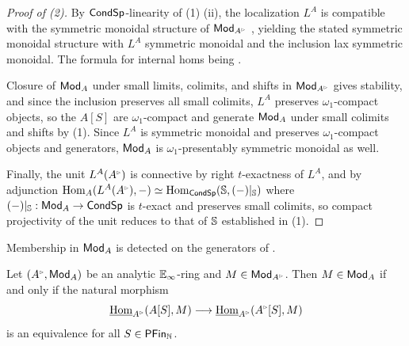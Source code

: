 \begin{proof}[Proof of (2)]
    By $\mathsf{Cond}\mathsf{Sp}$-linearity of  (1) (ii), the localization $L^{A}$ is compatible with the symmetric monoidal structure of $\Mod_{A^{\tri}}$ \cite[Lem. 7.4 \& 7.5]{RagimovReflection}, yielding the stated symmetric monoidal structure with $L^{A}$ symmetric monoidal and the inclusion lax symmetric monoidal. The formula for internal homs being \cite[Cor. 7.6]{RagimovReflection}. 
    
    Closure of $\mathsf{Mod}_{A}$ under small limits, colimits, and shifts in $\Mod_{A^{\tri}}$ gives stability, and since the inclusion preserves all small colimits, $L^{A}$ preserves $\omega_{1}$-compact objects, so the $A[S]$ are $\omega_{1}$-compact and generate $\mathsf{Mod}_{A}$ under small colimits and shifts by (1). Since $L^{A}$ is symmetric monoidal and preserves $\omega_{1}$-compact objects and generators, $\mathsf{Mod}_{A}$ is $\omega_{1}$-presentably symmetric monoidal as well. 
    
    Finally, the unit $L^{A}(A^{\tri})$ is connective by right $t$-exactness of $L^{A}$, and by adjunction $\Hom_{A}(L^{A}(A^{\tri}),-)\simeq\Hom_{\Cond\Sp}(\Sph,(-)|_{\Sph})$ where $(-)|_{\mathbb{S}}:\mathsf{Mod}_{A}\to\mathsf{Cond}\mathsf{Sp}$ is $t$-exact and preserves small colimits, so compact projectivity of the unit reduces to that of $\mathbb{S}$ established in  (1). 
\end{proof}
Membership in $\mathsf{Mod}_{A}$ is detected on the generators of .
\begin{corollary}\label{cor: testing by free on profinites}
    Let $(A^{\tri},\Mod_{A})$ be an analytic $\mathbb{E}_{\infty}$-ring and $M\in\Mod_{A^{\tri}}$. Then $M\in\mathsf{Mod}_{A}$ if and only if the natural morphism 
    \begin{equation}\label{eqn: analytic by free objects}
        \intHom_{A^{\tri}}(A[S],M)\longrightarrow\intHom_{A^{\tri}}(A^{\tri}[S],M)
    \end{equation}
    is an equivalence for all $S\in\mathsf{PFin}_{\mathbb{N}}$. 
\end{corollary}
